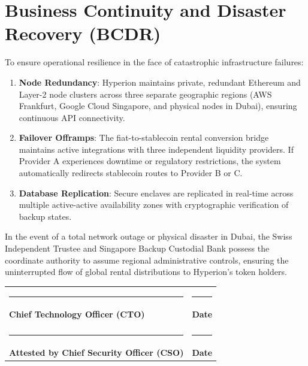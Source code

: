 \documentclass[11pt]{article}
\begin{document}
\section{Business Continuity and Disaster Recovery (BCDR)}
To ensure operational resilience in the face of catastrophic infrastructure failures:
\begin{enumerate}
    \item \textbf{Node Redundancy}: Hyperion maintains private, redundant Ethereum and Layer-2 node clusters across three separate geographic regions (AWS Frankfurt, Google Cloud Singapore, and physical nodes in Dubai), ensuring continuous API connectivity.
    \item \textbf{Failover Offramps}: The fiat-to-stablecoin rental conversion bridge maintains active integrations with three independent liquidity providers. If Provider A experiences downtime or regulatory restrictions, the system automatically redirects stablecoin routes to Provider B or C.
    \item \textbf{Database Replication}: Secure enclaves are replicated in real-time across multiple active-active availability zones with cryptographic verification of backup states.
\end{enumerate}

In the event of a total network outage or physical disaster in Dubai, the Swiss Independent Trustee and Singapore Backup Custodial Bank possess the coordinate authority to assume regional administrative controls, ensuring the uninterrupted flow of global rental distributions to Hyperion's token holders.

\par\vspace{1.5cm}
\noindent
\begin{tabularx}{\textwidth}{X X}
    \rule{4cm}{0.4pt} & \rule{4cm}{0.4pt} \\
    \textbf{Chief Technology Officer (CTO)} & \textbf{Date} \\
    & \\
    \rule{4cm}{0.4pt} & \rule{4cm}{0.4pt} \\
    \textbf{Attested by Chief Security Officer (CSO)} & \textbf{Date}
\end{tabularx}

\makehyperionseal
\end{document}
